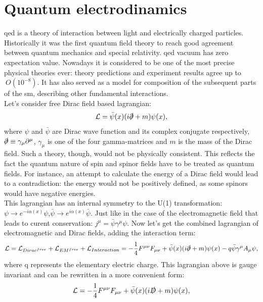 \section{Quantum electrodinamics}
\label{sec::qed}
\gls{qed} is a theory of interaction between light and electrically charged particles. Historically it was the first quantum field theory to reach good agreement between quantum mechanics and special relativity. \gls{qed} vacuum has zero expectation value.  Nowadays it is considered to be one of the most precise physical theories ever: theory predictions and experiment results agree up to $~O(10^{-8})$. It has also served as a model for composition of the subsequent parts of the \gls{sm}, describing other fundamental interactions.\\
Let's consider free Dirac field based lagrangian:
 \begin{equation}
\mathcal{L} = \bar \psi(x) (i\slashed\partial +m)\psi(x),
\end{equation}
where $\psi$ and $\bar \psi$ are Dirac wave function and its complex conjugate respectively, $\slashed\partial \equiv \gamma_{\mu}\partial^{\mu}$, $\gamma_{\mu}$ is one of the four gamma-matrices and $m$ is the mass of the Dirac field. 
Such a theory, though, would not be physically consistent. This reflects the fact the quantum nature of spin and spinor fields have to be treated as quantum fields. For instance, an attempt to calculate the energy of a Dirac field would lead to a contradiction: the energy would not be positively defined, as some spinors would have negative energies. \\
This lagrangian has an internal symmetry to the U(1) transformation: $\psi\rightarrow e^{-i\alpha(x)}\psi$,$\bar\psi\rightarrow e^{i\alpha(x)}\bar\psi$. Just like in the case of the electromagnetic field that leads to curent conservation: $j^{\mu}=\bar\psi\gamma^{\mu}\psi$.
Now let's get the combined lagrangian of electromagnetic and Dirac fields, adding the interaction term:
 \begin{equation}
\mathcal{L} = \mathcal{L}_{Dirac^{free}} + \mathcal{L}_{EM^{free}} + \mathcal{L}_{Interaction} = -\frac{1}{4} F^{\mu \nu}F_{\mu \nu}+\bar \psi(x) (i\slashed\partial +m)\psi(x) - q\bar\psi\gamma^{\mu}A_{\mu}\psi,
\end{equation}
where q represents the elementary electric charge. This lagrangian above is gauge invariant and can be rewritten in a more convenient form:
 \begin{equation}
\mathcal{L} =  -\frac{1}{4} F^{\mu \nu}F_{\mu \nu}+\bar \psi(x) (i\slashed D +m)\psi(x),
\end{equation}
